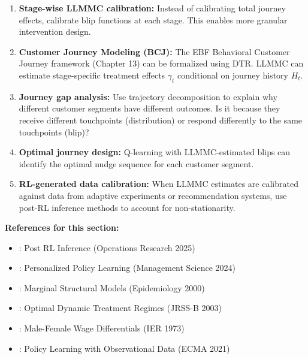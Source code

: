 \begin{enumerate}
\item \textbf{Stage-wise LLMMC calibration:}
Instead of calibrating total journey effects, calibrate blip functions at each stage.
This enables more granular intervention design.

\item \textbf{Customer Journey Modeling (BCJ):}
The EBF Behavioral Customer Journey framework (Chapter 13) can be formalized using
DTR. LLMMC can estimate stage-specific treatment effects $\gamma_t$ conditional on
journey history $H_t$.

\item \textbf{Journey gap analysis:}
Use trajectory decomposition to explain why different customer segments have different
outcomes. Is it because they receive different touchpoints (distribution) or respond
differently to the same touchpoints (blip)?

\item \textbf{Optimal journey design:}
Q-learning with LLMMC-estimated blips can identify the optimal nudge sequence for
each customer segment.

\item \textbf{RL-generated data calibration:}
When LLMMC estimates are calibrated against data from adaptive experiments or
recommendation systems, use post-RL inference methods \citep{PAP-syrgkanis2025postrl}
to account for non-stationarity.
\end{enumerate}

\textbf{References for this section:}
\begin{itemize}[nosep]
\item \citet{PAP-syrgkanis2025postrl}: Post RL Inference (Operations Research 2025)
\item \citet{PAP-zhang2024personalized}: Personalized Policy Learning (Management Science 2024)
\item \citet{PAP-robins2000msm}: Marginal Structural Models (Epidemiology 2000)
\item \citet{PAP-murphy2003optimal}: Optimal Dynamic Treatment Regimes (JRSS-B 2003)
\item \citet{PAP-oaxaca1973decomposition}: Male-Female Wage Differentials (IER 1973)
\item \citet{PAP-athey2021policy}: Policy Learning with Observational Data (ECMA 2021)
\end{itemize}



